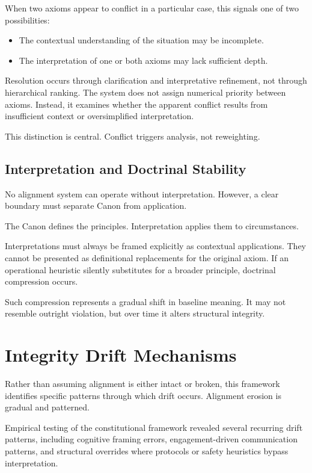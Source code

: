 \documentclass[11pt]{article}
\begin{document}
When two axioms appear to conflict in a particular case, this signals one of two possibilities:

\begin{itemize}
\item The contextual understanding of the situation may be incomplete.
\item The interpretation of one or both axioms may lack sufficient depth.
\end{itemize}

Resolution occurs through clarification and interpretative refinement, not through hierarchical ranking. The system does not assign numerical priority between axioms. Instead, it examines whether the apparent conflict results from insufficient context or oversimplified interpretation.

This distinction is central. Conflict triggers analysis, not reweighting.

\subsection{Interpretation and Doctrinal Stability}

No alignment system can operate without interpretation. However, a clear boundary must separate Canon from application.

The Canon defines the principles.  
Interpretation applies them to circumstances.

Interpretations must always be framed explicitly as contextual applications. They cannot be presented as definitional replacements for the original axiom. If an operational heuristic silently substitutes for a broader principle, doctrinal compression occurs.

Such compression represents a gradual shift in baseline meaning. It may not resemble outright violation, but over time it alters structural integrity.

\section{Integrity Drift Mechanisms}

Rather than assuming alignment is either intact or broken, this framework identifies specific patterns through which drift occurs. Alignment erosion is gradual and patterned.

Empirical testing of the constitutional framework revealed several recurring drift patterns, including cognitive framing errors, engagement-driven communication patterns, and structural overrides where protocols or safety heuristics bypass interpretation.
\end{document}
